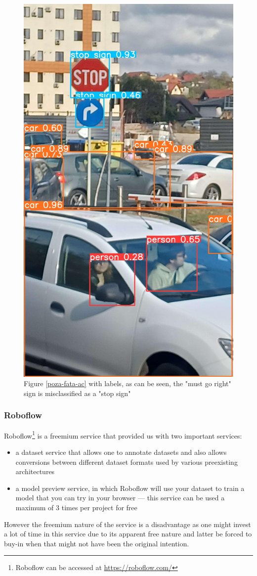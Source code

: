 \documentclass[conference]{IEEEtran}
\begin{document}
\begin{figure}
    \centerline{\includegraphics[width=0.5\linewidth]{poza-fata-ac-results}}
    \caption{Figure \ref{poza-fata-ac} with labels, as can be seen, the "must go right" sign is
    misclassified as a "stop sign"}
\end{figure}

\subsubsection{Roboflow}

Roboflow\footnote{Roboflow can be accessed at \url{https://roboflow.com/}} is a freemium service that provided us with two important services:
\begin{itemize}
    \item a dataset service that allows one to annotate datasets and also allows conversions
     between different dataset formats used by various preexisting architectures
    \item a model preview service, in which Roboflow will use your dataset to train a model that
    you can try in your browser --- this service can be used a maximum of 3 times per project for free
\end{itemize}

However the freemium nature of the service is a disadvantage as one might invest a lot of time in
this service due to its apparent free nature and latter be forced to buy-in when that might not have
been the original intention.
\end{document}
